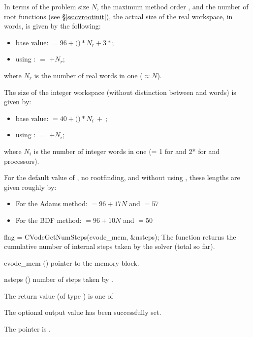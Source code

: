 {
  In terms of the problem size $N$, the maximum method order , and
  the number  of root functions (see \S\ref{ss:cvrootinit}),
  the actual size of the real workspace, in  words, is
  given by the following:
  \begin{itemize}
  \item base value:  $= 96 + ($$)*N_r + 3*$;
  \item using :  $=$  $+ N_r$;
  \end{itemize}
  where $N_r$ is the number of real words in one  ($\approx N$).

  The size of the integer workspace (without distinction between  
  and  words) is given by:
  \begin{itemize}
  \item base value:  $= 40 + ($$)*N_i ~ + ~ $;  
  \item using :  $=$  $+ N_i$;
  \end{itemize}
  where $N_i$ is the number of integer words in one 
  (= 1 for {\nvecs} and 2* for {\nvecp} and  processors).

  For the default value of , no rootfinding, and without
  using , these lengths are given roughly by:
  \begin{itemize}
  \item For the Adams method:  $= 96 + 17N$ and  $= 57$ 
  \item For the BDF method:  $= 96 + 10N$ and  $= 50$ 
  \end{itemize}
}
{
  flag = CVodeGetNumSteps(cvode\_mem, \&nsteps);
}
{
  The function  returns the cumulative number of internal 
  steps taken by the solver (total so far).
}
{
  \begin{args}
  \item[cvode\_mem] ()
    pointer to the {\cvode} memory block.
  \item[nsteps] ()
    number of steps taken by {\cvode}.
  \end{args}
}
{
  The return value  (of type ) is one of
  \begin{args}
  \item[\Id{CV\_SUCCESS}] 
    The optional output value has been successfully set.
  \item[\Id{CV\_MEM\_NULL}]
    The  pointer is .
  \end{args}
}
